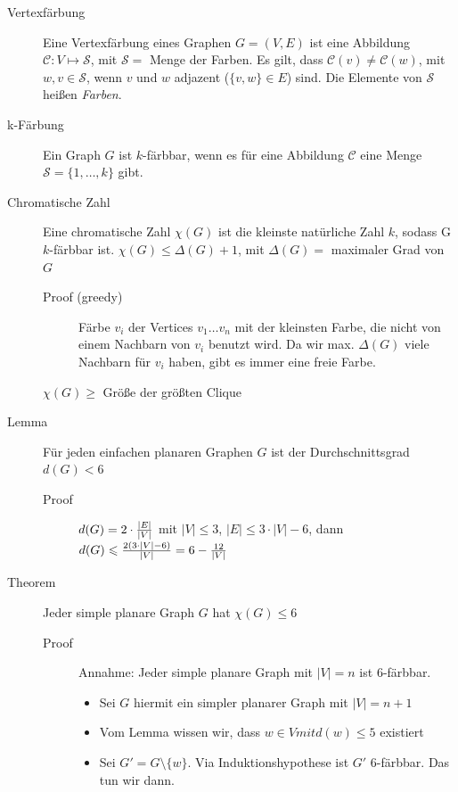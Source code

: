 \begin{description}
    \item[Vertexfärbung] Eine Vertexfärbung eines Graphen $G=(V,E)$ ist eine Abbildung $\mathcal{C} \colon V \mapsto \mathcal{S}$, mit $\mathcal{S}=$ Menge der Farben. Es gilt, dass $\mathcal{C}(v) \neq \mathcal{C}(w)$, mit $w,v \in \mathcal{S}$, wenn $v$ und $w$ adjazent ($\{v,w\} \in E$) sind. Die Elemente von $\mathcal{S}$ heißen \emph{Farben}.
    \item[k-Färbung] Ein Graph $G$ ist $k$-färbbar, wenn es für eine Abbildung $\mathcal{C}$ eine Menge $\mathcal{S}=\{1,\dots,k\}$ gibt.
    \item[Chromatische Zahl] Eine chromatische Zahl $\chi(G)$ ist die kleinste natürliche Zahl $k$, sodass G $k$-färbbar ist. $\chi(G) \leqslant \Delta(G) + 1$, mit $\Delta(G) = $ maximaler Grad von $G$
        \begin{description}
            \item[Proof (greedy)] Färbe $v_i$ der Vertices $v_1 \dots v_n$ mit der kleinsten Farbe, die nicht von einem Nachbarn von $v_i$ benutzt wird. Da wir max. $\Delta(G)$ viele Nachbarn für $v_i$ haben, gibt es immer eine freie Farbe.
        \end{description}
        $\chi(G) \geqslant$ Größe der größten Clique
    \item[Lemma] Für jeden einfachen planaren Graphen $G$ ist der Durchschnittsgrad $d(G) < 6$
        \begin{description}
            \item[Proof] $d(G) = 2 \cdot {|E| \over |V|}$ mit $|V| \leqslant 3$, $|E| \leqslant 3  \cdot |V| - 6$, dann $d(G) \leqslant {2(3 \cdot |V|-6) \over |V|} = 6-{12 \over |V|}$
        \end{description}
    \item[Theorem] Jeder simple planare Graph $G$ hat $\chi(G) \leqslant 6$
        \begin{description}
            \item[Proof] Annahme: Jeder simple planare Graph mit $|V| = n$ ist $6$-färbbar.
            \begin{itemize}
                \item Sei $G$ hiermit ein simpler planarer Graph mit $|V| = n+1$
                \item Vom Lemma wissen wir, dass $w \in V mit d(w) \leqslant 5$ existiert
                \item Sei $G' = G \setminus \{w\}$. Via Induktionshypothese ist $G'$ 6-färbbar. Das tun wir dann.

\end{itemize}
\end{description}
\end{description}
